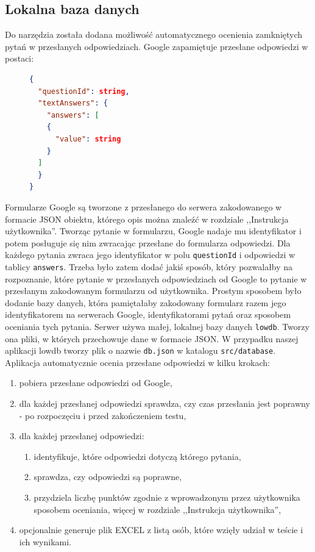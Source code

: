 \subsection{Lokalna baza danych}
Do narzędzia została dodana możliwość automatycznego ocenienia zamkniętych pytań w 
przesłanych odpowiedziach. Google zapamiętuje przesłane odpowiedzi w postaci:
\begin{figure}[H]
  \begin{lstlisting}[language=json,firstnumber=1]
{
  "questionId": string,
  "textAnswers": {
    "answers": [
    {
      "value": string
    }
  ]
  }
}
  \end{lstlisting}
\end{figure}
Formularze Google są tworzone z przesłanego do serwera zakodowanego w formacie JSON obiektu,
którego opis można znaleźć w rozdziale ,,Instrukcja użytkownika''.
Tworząc pytanie w formularzu, Google nadaje mu identyfikator i potem posługuje się nim
zwracając przesłane do formularza odpowiedzi. Dla każdego pytania zwraca jego identyfikator 
w polu \texttt{questionId} i odpowiedzi w tablicy \texttt{answers}. Trzeba było zatem dodać
jakiś sposób, który pozwalałby na rozpoznanie, które pytanie w przesłanych odpowiedziach od 
Google to pytanie w przesłanym zakodowanym formularzu od użytkownika. Prostym sposobem było
dodanie bazy danych, która pamiętałaby zakodowany formularz razem jego identyfikatorem 
na serwerach Google, identyfikatorami pytań oraz sposobem oceniania tych pytania. Serwer
używa małej, lokalnej bazy
danych \texttt{lowdb}. Tworzy ona pliki, w których przechowuje dane w formacie JSON.
W przypadku naszej aplikacji lowdb tworzy plik o nazwie \texttt{db.json} w katalogu 
\texttt{src/database}. Aplikacja automatycznie ocenia przesłane odpowiedzi w kilku krokach:
\begin{enumerate}
  \item pobiera przesłane odpowiedzi od Google,
  \item dla każdej przesłanej odpowiedzi sprawdza, czy czas przesłania jest poprawny - po 
    rozpoczęciu i przed zakończeniem testu,
  \item dla każdej przesłanej odpowiedzi:
    \begin{enumerate}
      \item identyfikuje, które odpowiedzi dotyczą którego pytania,
      \item sprawdza, czy odpowiedzi są poprawne,
      \item przydziela liczbę punktów zgodnie z wprowadzonym przez użytkownika sposobem
        oceniania, więcej w rozdziale ,,Instrukcja użytkownika'',
    \end{enumerate}
  \item opcjonalnie generuje plik EXCEL z listą osób, które wzięły udział w teście
    i~ ich wynikami.
\end{enumerate}

